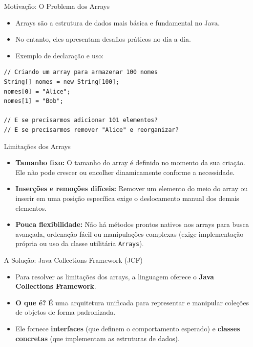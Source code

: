 \documentclass[9pt]{beamer}
\begin{document}
\begin{frame}[fragile]{Motivação: O Problema dos Arrays}
    \begin{itemize}
        \item Arrays são a estrutura de dados mais básica e fundamental no Java.
        \item No entanto, eles apresentam desafios práticos no dia a dia.
        \item Exemplo de declaração e uso:
    \end{itemize}
    \begin{lstlisting}
// Criando um array para armazenar 100 nomes
String[] nomes = new String[100];
nomes[0] = "Alice";
nomes[1] = "Bob";

// E se precisarmos adicionar 101 elementos?
// E se precisarmos remover "Alice" e reorganizar?
    \end{lstlisting}
\end{frame}

\begin{frame}{Limitações dos Arrays}
    \begin{itemize}
        \item \textbf{Tamanho fixo:} O tamanho do array é definido no momento da sua criação. Ele não pode crescer ou encolher dinamicamente conforme a necessidade.
        \item \textbf{Inserções e remoções difíceis:} Remover um elemento do meio do array ou inserir em uma posição específica exige o deslocamento manual dos demais elementos.
        \item \textbf{Pouca flexibilidade:} Não há métodos prontos nativos nos arrays para busca avançada, ordenação fácil ou manipulações complexas (exige implementação própria ou uso da classe utilitária \texttt{Arrays}).
    \end{itemize}
\end{frame}

\begin{frame}{A Solução: Java Collections Framework (JCF)}
    \begin{itemize}
        \item Para resolver as limitações dos arrays, a linguagem oferece o \textbf{Java Collections Framework}.
        \item \textbf{O que é?} É uma arquitetura unificada para representar e manipular coleções de objetos de forma padronizada.
        \item Ele fornece \textbf{interfaces} (que definem o comportamento esperado) e \textbf{classes concretas} (que implementam as estruturas de dados).
    \end{itemize}
\end{frame}
\end{document}
